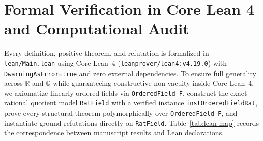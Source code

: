 \documentclass[11pt]{article}
\theoremstyle{definition}
\theoremstyle{remark}
\begin{document}
\section{Formal Verification in Core Lean 4 and Computational Audit}
\label{sec:formal}

Every definition, positive theorem, and refutation is formalized in \texttt{lean/Main.lean} using Core Lean~4 (\texttt{leanprover/lean4:v4.19.0}) with \texttt{-DwarningAsError=true} and zero external dependencies. To ensure full generality across $\mathbb{R}$ and $\mathbb{Q}$ while guaranteeing constructive non-vacuity inside Core Lean~4, we axiomatize linearly ordered fields via \texttt{OrderedField F}, construct the exact rational quotient model \texttt{RatField} with a verified instance \texttt{instOrderedFieldRat}, prove every structural theorem polymorphically over \texttt{OrderedField F}, and instantiate ground refutations directly on \texttt{RatField}. Table~\ref{tab:lean-map} records the correspondence between manuscript results and Lean declarations.
\end{document}
